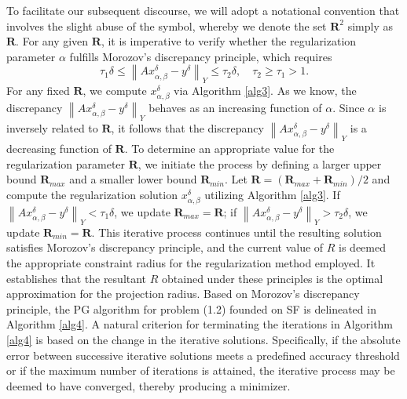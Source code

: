 \documentclass[a4paper,12pt]{article}
\numberwithin{equation}{section}
\begin{document}
\par To facilitate our subsequent discourse, we will adopt a notational convention that involves the slight abuse of the symbol, whereby we denote the set  $\mathbf{R}^{2}$ simply as $\mathbf{R}$. For any given $\mathbf{R}$, it is imperative to verify whether the regularization parameter $\alpha$ fulfills Morozov's discrepancy principle, which requires
\begin{equation*}
    \tau_{1}\delta\leq \left\|Ax_{\alpha,\beta}^{\delta}-y^{\delta}\right\|_{Y}\leq \tau_{2}\delta,\quad \tau_{2}\geq \tau_{1}>1.
\end{equation*}
For any fixed $\mathbf{R}$, we compute $x_{\alpha,\beta}^{\delta}$ via Algorithm \ref{alg3}. As we know, the discrepancy $\left\|Ax_{\alpha,\beta}^{\delta}-y^{\delta}\right\|_{Y}$ behaves as an increasing function of $\alpha$. Since $\alpha$ is inversely related to $\mathbf{R}$, it follows that the discrepancy $\left\|Ax_{\alpha,\beta}^{\delta}-y^{\delta}\right\|_{Y}$ is a decreasing function of $\mathbf{R}$. To determine an appropriate value for the regularization parameter $\mathbf{R}$, we initiate the process by defining a larger upper bound $\mathbf{R}_{max}$ and a smaller lower bound $\mathbf{R}_{min}$. Let $\mathbf{R}=\left(\mathbf{R}_{max}+\mathbf{R}_{min}\right)/2$ and compute the regularization solution $x_{\alpha,\beta}^{\delta}$ utilizing Algorithm \ref{alg3}. If $\left\|Ax_ {\alpha,\beta}^{\delta}-y^{\delta}\right\|_{Y}<\tau_{1}\delta$, we update $\mathbf{R}_{max}=\mathbf{R}$; if $\left\|Ax_ {\alpha,\beta}^{\delta}-y^{\delta}\right\|_{Y}>\tau_{2}\delta$, we update $\mathbf{R}_{min}=\mathbf{R}$. This iterative process continues until the resulting solution satisfies Morozov's discrepancy principle, and the current value of $R$ is deemed the appropriate constraint radius for the regularization method employed. It establishes that the resultant $R$ obtained under these principles is the optimal approximation for the projection radius. Based on Morozov's discrepancy principle, the PG algorithm for problem (1.2) founded on SF is delineated in Algorithm \ref{alg4}. A natural criterion for terminating the iterations in Algorithm \ref{alg4} is based on the change in the iterative solutions. Specifically, if the absolute error between successive iterative solutions meets a predefined accuracy threshold or if the maximum number of iterations is attained, the iterative process may be deemed to have converged, thereby producing a minimizer.
\end{document}
